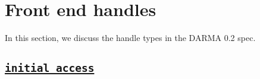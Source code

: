 







\clearpage

\section{Front end handles}

In this section, we discuss the handle types in the DARMA 0.2 spec.


\subsection{\underline{\texttt{initial\_access}}}

\hspace{0.1cm} %
